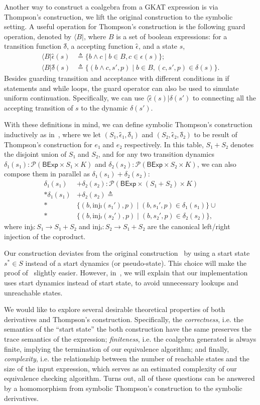 \documentclass[conference]{IEEEtran}
\newcommand{\theoryOf}[1]{\ensuremath{\mathsf{#1}}}
\newcommand{\BExp}{\theoryOf{BExp}}
\begin{document}
Another way to construct a coalgebra from a GKAT expression is via Thompson's construction, we lift the original construction to the symbolic setting.
A useful operation for Thompson's construction is the following guard operation, denoted by \(⟨B|\), where \(B\) is a set of boolean expressions: for a transition function \(δ̂\), a accepting function \(ϵ̂\), and a state \(s\),
\begin{align*}
    ⟨B|ϵ̂(s) & ≜ \{b ∧ c ∣ b ∈ B, c ∈ ϵ(s)\}; \\
    ⟨B|δ̂(s) & ≜ \{(b ∧ c, s', p) ∣ b ∈ B, (c, s', p) ∈ δ(s)\}.
\end{align*}
Besides guarding transition and acceptance with different conditions in if statements and while loops, the guard operator can also be used to simulate uniform continuation. Specifically, we can use \(⟨ϵ̂(s)|δ(s')\) to connecting all the accepting transition of \(s\) to the dynamic \(δ(s')\).

With these definitions in mind, we can define symbolic Thompson's construction inductively as in~, where we let \((S₁, ϵ̂₁, δ̂₁)\) and \((S₂, ϵ̂₂, δ̂₂)\) to be result of Thompson's construction for \(e₁\) and \(e₂\) respectively.
In this table, \(S₁ + S₂\) denotes the disjoint union of \(S₁\) and \(S₂\), and for any two transition dynamics \(δ₁(s₁): 𝒫(\BExp × S₁ × K)\) and \(δ₂(s₂): 𝒫(\BExp × S₂ × K)\), we can also compose them in parallel as \(δ₁(s₁) + δ₂(s₂)\):
\begin{align*}
    δ₁(s₁) & + δ₂(s₂): 𝒫(\BExp × (S₁ + S₂) × K) \\*
    δ₁(s₁) & + δ₂(s₂) ≜ \\*
        & \{(b, \mathrm{inj}ₗ(s₁'), p) ∣ (b, s₁', p) ∈ δ₁(s₁)\} ∪ \\*
        & \{(b, \mathrm{inj}ᵣ(s₂'), p) ∣ (b, s₂', p) ∈ δ₂(s₂)\},
\end{align*}
where \(\mathrm{inj}ₗ: S₁ → S₁ + S₂\) and \(\mathrm{inj}ᵣ: S₂ → S₁ + S₂\) are the canonical left/right injection of the coproduct.

Our construction deviates from the original construction~\cite{smolka_GuardedKleeneAlgebra_2020} by using a start state \(s^* ∈ S\) instead of a start dynamics (or pseudo-state).
This choice will make the proof of~ slightly easier. 
However, in~, we will explain that our implementation uses start dynamics instead of start state, to avoid unnecessary lookups and unreachable states.

We would like to explore several desirable theoretical properties of both derivatives and Thompson's construction.
Specifically, the \emph{correctness}, i.e. the semantics of the ``start state'' the both construction have the same preserves the trace semantics of the expression; \emph{finiteness}, i.e. the coalgebra generated is always finite, implying the termination of our equivalence algorithm; and finally, \emph{complexity}, i.e. the relationship between the number of reachable states and the size of the input expression, which serves as an estimated complexity of our equivalence checking algorithm.
Turns out, all of these questions can be answered by a homomorphism from symbolic Thompson's construction to the symbolic derivatives.
\end{document}
